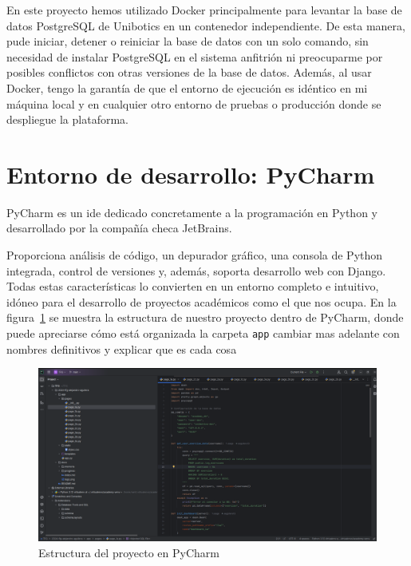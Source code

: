 \documentclass[a4paper, 12pt]{book}
\begin{document}
En este proyecto hemos utilizado Docker principalmente para levantar la base de datos PostgreSQL de Unibotics en un contenedor independiente. De esta manera, pude iniciar, detener o reiniciar la base de datos con un solo comando, sin necesidad de instalar PostgreSQL en el sistema anfitrión ni preocuparme por posibles conflictos con otras versiones de la base de datos. Además, al usar Docker, tengo la garantía de que el entorno de ejecución es idéntico en mi máquina local y en cualquier otro entorno de pruebas o producción donde se despliegue la plataforma.


\section{Entorno de desarrollo: PyCharm}
\label{sec:entorno_de_desarrollo}

PyCharm es un \gls{ide} dedicado concretamente a la programación en Python y desarrollado por la compañía checa JetBrains.

Proporciona análisis de código, un depurador gráfico, una consola de Python integrada, control de versiones y, además, soporta desarrollo web con Django. Todas estas características lo convierten en un entorno completo e intuitivo, idóneo para el desarrollo de proyectos académicos como el que nos ocupa. En la figura~\ref{fig:pycharm_project} se muestra la estructura de nuestro proyecto dentro de PyCharm, donde puede apreciarse cómo está organizada la carpeta \texttt{app} cambiar mas adelante con nombres definitivos y explicar que es cada cosa

\begin{figure}[h!]
    \centering
    \includegraphics[width=\textwidth]{img/pycharm.png}
    \caption{Estructura del proyecto en PyCharm}
    \label{fig:pycharm_project}
\end{figure}
\end{document}
